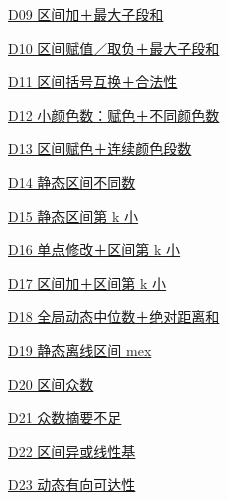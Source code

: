 \documentclass[10pt,a4paper]{article}
\begin{document}
\noindent\hyperref[D09]{D09 区间加＋最大子段和\nobreak\hfill\pageref*{D09}}\par\vspace{1.5pt}
\noindent\hyperref[D10]{D10 区间赋值／取负＋最大子段和\nobreak\hfill\pageref*{D10}}\par\vspace{1.5pt}
\noindent\hyperref[D11]{D11 区间括号互换＋合法性\nobreak\hfill\pageref*{D11}}\par\vspace{1.5pt}
\noindent\hyperref[D12]{D12 小颜色数：赋色＋不同颜色数\nobreak\hfill\pageref*{D12}}\par\vspace{1.5pt}
\noindent\hyperref[D13]{D13 区间赋色＋连续颜色段数\nobreak\hfill\pageref*{D13}}\par\vspace{1.5pt}
\noindent\hyperref[D14]{D14 静态区间不同数\nobreak\hfill\pageref*{D14}}\par\vspace{1.5pt}
\noindent\hyperref[D15]{D15 静态区间第 k 小\nobreak\hfill\pageref*{D15}}\par\vspace{1.5pt}
\noindent\hyperref[D16]{D16 单点修改＋区间第 k 小\nobreak\hfill\pageref*{D16}}\par\vspace{1.5pt}
\noindent\hyperref[D17]{D17 区间加＋区间第 k 小\nobreak\hfill\pageref*{D17}}\par\vspace{1.5pt}
\noindent\hyperref[D18]{D18 全局动态中位数＋绝对距离和\nobreak\hfill\pageref*{D18}}\par\vspace{1.5pt}
\noindent\hyperref[D19]{D19 静态离线区间 mex\nobreak\hfill\pageref*{D19}}\par\vspace{1.5pt}
\noindent\hyperref[D20]{D20 区间众数\nobreak\hfill\pageref*{D20}}\par\vspace{1.5pt}
\noindent\hyperref[D21]{D21 众数摘要不足\nobreak\hfill\pageref*{D21}}\par\vspace{1.5pt}
\noindent\hyperref[D22]{D22 区间异或线性基\nobreak\hfill\pageref*{D22}}\par\vspace{1.5pt}
\noindent\hyperref[D23]{D23 动态有向可达性\nobreak\hfill\pageref*{D23}}\par\vspace{1.5pt}
\end{document}
